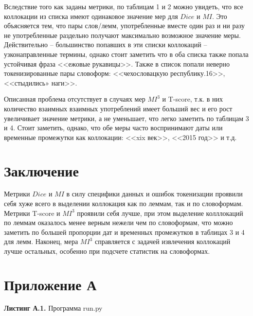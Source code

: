\documentclass[12pt,a4paper]{article}
\begin{document}
	\begin{results}
		Вследствие того как заданы метрики, по таблицам 1 и 2 можно увидеть, что все коллокации из списка имеют одинаковое значение мер для $Dice$ и $MI$. Это объясняется тем, что пары слов/лемм, употребленные вместе один раз и ни разу не употребленные раздельно получают максимально возможное значение меры. Действительно -- большинство попавших в эти списки коллокаций -- узконаправленные термины, однако стоит заметить что в оба списка также попала устойчивая фраза <<ежовые рукавицы>>. Также в список попали неверно токенизированные пары словоформ: <<чехословацкую республику.16>>, <<стыдились» наги>>.

        Описанная проблема отсутствует в случаях мер $MI^3$ и T-score, т.к. в них количество взаимных взаимных употреблений имеет больший вес и его рост увеличивает значение метрики, а не уменьшает, что легко заметить по таблицам 3 и 4. Стоит заметить, однако, что обе меры часто воспринимают даты или временные промежутки как коллокации: <<xix век>>, <<2015 год>> и т.д.
	\end{results}

	\section*{Заключение}
	
	Метрики $Dice$ и $MI$ в силу специфики данных и ошибок токенизации проявили себя хуже всего в выделении коллокация как по леммам, так и по словоформам. Метрики T-score и $MI^3$ проявили себя лучше, при этом выделение колллокаций по леммам оказалось менее верным нежели чем по словоформам, что можно заметить по большей пропорции дат и временных промежутков в таблицах 3 и 4 для лемм. Наконец, мера $MI^3$ справляется с задачей извлечения коллокаций лучше остальных, особенно при подсчете статистик на словоформах. 

	\section*{Приложение А}
	
	\centering\textbf{Листинг А.1.} Программа run.py
	
\end{document}
